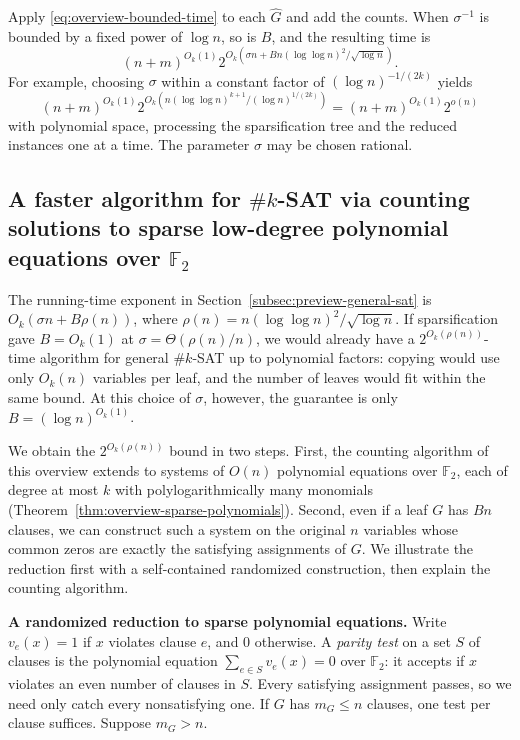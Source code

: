 \documentclass[11pt,reqno]{amsart}
\numberwithin{equation}{section}
\theoremstyle{definition}\newtheorem{definition}[theorem]{Definition}
\theoremstyle{remark}\newtheorem{remark}[theorem]{Remark}
\renewcommand{\le}{\leqslant}
\begin{document}
Apply \eqref{eq:overview-bounded-time} to each $\widehat G$ and add
the counts. When $\sigma^{-1}$ is bounded by a fixed power of
$\log n$, so is $B$, and the resulting time is
\[
 (n+m)^{O_k(1)}
 2^{O_k\!\left(\sigma n+
          Bn(\log\log n)^2/\sqrt{\log n}\right)}.
\]
For example, choosing $\sigma$ within a constant factor of
$(\log n)^{-1/(2k)}$ yields
\[
 (n+m)^{O_k(1)}
 2^{O_k\!\left(n(\log\log n)^{k+1}/(\log n)^{1/(2k)}\right)}
   = (n+m)^{O_k(1)}2^{o(n)}
\]
with polynomial space, processing the sparsification tree and
the reduced instances one at a time. The parameter $\sigma$ may
be chosen rational.

\subsection{A faster algorithm for \texorpdfstring{$\#k$-SAT}{\#k-SAT} via counting solutions to sparse low-degree polynomial equations over \texorpdfstring{$\mathbb F_2$}{F\_2}}
\label{subsec:preview-full-case}

The running-time exponent in Section~\ref{subsec:preview-general-sat}
is $O_k(\sigma n+B\rho(n))$, where
$\rho(n)=n(\log\log n)^2/\sqrt{\log n}$. If sparsification gave
$B=O_k(1)$ at $\sigma=\Theta(\rho(n)/n)$, we would already have a
$2^{O_k(\rho(n))}$-time algorithm for general $\#k$-SAT up to
polynomial factors: copying would use only $O_k(n)$ variables per
leaf, and the number of leaves would fit within the same bound.
At this choice of $\sigma$, however, the guarantee is only
$B=(\log n)^{O_k(1)}$.

We obtain the $2^{O_k(\rho(n))}$ bound in two steps. First, the counting
algorithm of this overview extends to systems of $O(n)$ polynomial
equations over $\mathbb F_2$, each of degree at most $k$ with
polylogarithmically many monomials
(Theorem~\ref{thm:overview-sparse-polynomials}). Second, even if a
leaf $G$ has $Bn$ clauses, we can construct such a system on the
original $n$ variables whose common zeros are exactly the satisfying
assignments of $G$. We illustrate the reduction first with a
self-contained randomized construction, then explain the counting
algorithm.

\medskip\noindent
\textbf{A randomized reduction to sparse polynomial equations.}
Write $v_e(x)=1$ if $x$ violates clause $e$, and $0$ otherwise. A
\emph{parity test} on a set $S$ of clauses is the polynomial equation
$\sum_{e\in S}v_e(x)=0$ over $\mathbb F_2$: it accepts if $x$ violates
an even number of clauses in $S$. Every satisfying assignment passes,
so we need only catch every nonsatisfying one. If $G$ has $m_G\le n$
clauses, one test per clause suffices. Suppose $m_G>n$.
\end{document}
